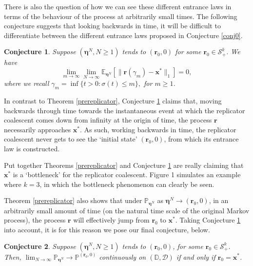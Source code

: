 \documentclass[12pt, leqno]{article}
\newtheorem{conjecture}{Conjecture}
\newcommand*{\norm}[1]{\lVert #1 \rVert}
\begin{document}
 There is also the question of how we can see these different entrance laws in terms of the behaviour of the process at arbitrarily small times.
The following conjecture suggests that looking backwards in time, it will be difficult to differentiate between the different entrance laws proposed in Conjecture \ref{conj0}.

\medskip

\begin{conjecture}\label{conj1}Suppose $(\bm \eta^N, N\geq 1)$ tends to $( \bm r_0, 0)$ for some $\bm r_0\in\mathcal{S}^k_+$. We have
\[
\lim_{m\to\infty} \lim_{N\to\infty}\mathbb{E}_{{\bm \eta}^N}\left[\norm{ \bm r(\gamma_m)-\bm x^*}_1\right]=0, 
 \]
where we recall
 $
 \gamma_m=\inf\{t>0: \sigma(t) \leq m\},
 $ for $m\geq1$.
\end{conjecture}


In contrast to Theorem \ref{prereplicator}, Conjecture \ref{conj1} claims that, moving backwards through time  towards the instantaneous event at which the replicator coalescent comes down from infinity at the origin of time, the process $\bm r$ necessarily approaches  $\bm x^*$. As such, working backwards in time, the replicator coalescent never gets to see the `initial state' $(\bm r_0,0)$, from which its entrance law is constructed.

\medskip

Put together Theorems \ref{prereplicator} and Conjecture \ref{conj1} are really claiming  that $\bm x^*$ is a `bottleneck' for the replicator coalescent. Figure 1 simulates an example where $k =3$, in which the bottleneck phenomenon can clearly be seen.

\medskip
Theorem \ref{prereplicator} also shows that  under $\mathbb{P}_{\bm\eta^N}$ as $\bm \eta^N\to(\bm r_0,0)$, in an arbitrarily small amount of time (on the  natural time scale of the original Markov process), the process $\bm r$ will effectively jump from $\bm r_0$ to $\bm x^*$. Taking Conjecture \ref{conj1} into account, it is for this reason we pose our final conjecture, below.


\begin{conjecture}\label{conj2} Suppose $(\bm \eta^N, N\geq 1)$ tends to $( \bm r_0, 0)$, for some $\bm r_0\in\mathcal{S}^k_+$. Then, $\lim_{N\to\infty}\mathbb{P}_{\bm\eta^N} \to \mathbb{P}^{(\bm r_0, 0)}$ continuously on $(\mathbb{D}, \mathcal{D})$ if and only if  $\bm r_0 = \bm x^*$. %
\end{conjecture}
\end{document}
